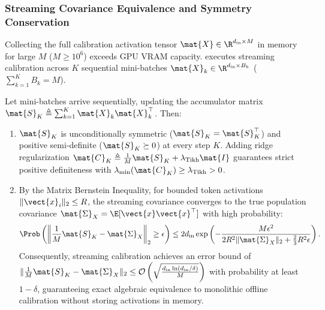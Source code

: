 \subsubsection{Streaming Covariance Equivalence and Symmetry Conservation}
Collecting the full calibration activation tensor $\mat{X} \in \R^{d_{\text{in}} \times M}$ in memory for large $M$ ($M \ge 10^6$) exceeds GPU VRAM capacity. \neuralops{} executes streaming calibration across $K$ sequential mini-batches $\mat{X}_k \in \R^{d_{\text{in}} \times B_k}$ ($\sum_{k=1}^K B_k = M$).

\begin{lemma}
\label{lem:streaming_covariance}
Let mini-batches arrive sequentially, updating the accumulator matrix $\mat{S}_K \triangleq \sum_{k=1}^K \mat{X}_k \mat{X}_k^\top$. Then:
\begin{enumerate}
    \item $\mat{S}_K$ is unconditionally symmetric ($\mat{S}_K = \mat{S}_K^\top$) and positive semi-definite ($\mat{S}_K \succeq 0$) at every step $K$. Adding ridge regularization $\mat{C}_K \triangleq \frac{1}{M}\mat{S}_K + \lambda_{\text{Tikh}} \mat{I}$ guarantees strict positive definiteness with $\lambda_{\min}(\mat{C}_K) \ge \lambda_{\text{Tikh}} > 0$.
    \item By the Matrix Bernstein Inequality, for bounded token activations $\|\vect{x}_i\|_2 \le R$, the streaming covariance converges to the true population covariance $\mat{\Sigma}_X = \E[\vect{x}\vect{x}^\top]$ with high probability:
    \begin{equation}
    \Prob\left( \left\| \frac{1}{M} \mat{S}_K - \mat{\Sigma}_X \right\|_2 \ge \epsilon \right) \le 2 d_{\text{in}} \exp\left( - \frac{M \epsilon^2}{2 R^2 \|\mat{\Sigma}_X\|_2 + \frac{2}{3} R^2 \epsilon} \right).
    \label{eq:matrix_bernstein}
    \end{equation}
    Consequently, streaming calibration achieves an error bound of $\| \frac{1}{M}\mat{S}_K - \mat{\Sigma}_X \|_2 \le \mathcal{O}\left( \sqrt{\frac{d_{\text{in}} \ln(d_{\text{in}}/\delta)}{M}} \right)$ with probability at least $1 - \delta$, guaranteeing exact algebraic equivalence to monolithic offline calibration without storing activations in memory.
\end{enumerate}
\end{lemma}

